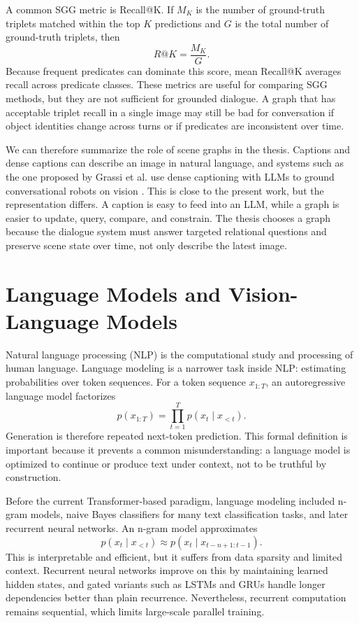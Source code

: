 A common SGG metric is Recall@K. If \(M_K\) is the number of ground-truth triplets matched within the top \(K\) predictions and \(G\) is the total number of ground-truth triplets, then
\[
R@K=\frac{M_K}{G}.
\]
Because frequent predicates can dominate this score, mean Recall@K averages recall across predicate classes. These metrics are useful for comparing SGG methods, but they are not sufficient for grounded dialogue. A graph that has acceptable triplet recall in a single image may still be bad for conversation if object identities change across turns or if predicates are inconsistent over time.

We can therefore summarize the role of scene graphs in the thesis. Captions and dense captions can describe an image in natural language, and systems such as the one proposed by Grassi et al. use dense captioning with LLMs to ground conversational robots on vision \cite{grassi_grounding_2024}. This is close to the present work, but the representation differs. A caption is easy to feed into an LLM, while a graph is easier to update, query, compare, and constrain. The thesis chooses a graph because the dialogue system must answer targeted relational questions and preserve scene state over time, not only describe the latest image.

\section{Language Models and Vision-Language Models}\label{sec:llms-vlms}

Natural language processing (NLP) is the computational study and processing of human language. Language modeling is a narrower task inside NLP: estimating probabilities over token sequences. For a token sequence \(x_{1:T}\), an autoregressive language model factorizes
\[
p(x_{1:T})=\prod_{t=1}^{T}p(x_t\mid x_{<t}).
\]
Generation is therefore repeated next-token prediction. This formal definition is important because it prevents a common misunderstanding: a language model is optimized to continue or produce text under context, not to be truthful by construction.

Before the current Transformer-based paradigm, language modeling included n-gram models, naive Bayes classifiers for many text classification tasks, and later recurrent neural networks. An n-gram model approximates
\[
p(x_t\mid x_{<t})\approx p(x_t\mid x_{t-n+1:t-1}).
\]
This is interpretable and efficient, but it suffers from data sparsity and limited context. Recurrent neural networks improve on this by maintaining learned hidden states, and gated variants such as LSTMs and GRUs handle longer dependencies better than plain recurrence. Nevertheless, recurrent computation remains sequential, which limits large-scale parallel training.

